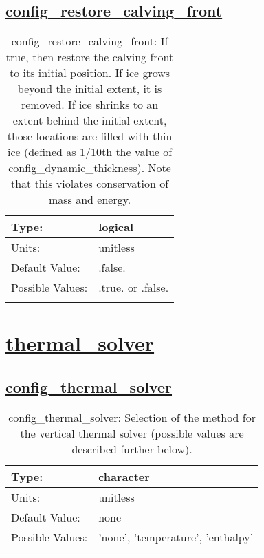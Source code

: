 \subsection[config\_restore\_calving\_front]{\hyperref[sec:nm_tab_calving]{config\_restore\_calving\_front}}
\label{subsec:nm_sec_config_restore_calving_front}
\begin{center}
\begin{longtable}{| p{2.0in} || p{4.0in} |}
    \hline
    Type: & logical \\
    \hline
    Units: & \si{unitless} \\
    \hline
    Default Value: & .false. \\
    \hline
    Possible Values: & .true. or .false. \\
    \hline
    \caption{config\_restore\_calving\_front: If true, then restore the calving front to its initial position.  If ice grows beyond the initial extent, it is removed.  If ice shrinks to an extent behind the initial extent, those locations are filled with thin ice (defined as 1/10th the value of config\_dynamic\_thickness).  Note that this violates conservation of mass and energy.}
\end{longtable}
\end{center}
\section[thermal\_solver]{\hyperref[sec:nm_tab_thermal_solver]{thermal\_solver}}
\label{sec:nm_sec_thermal_solver}
\subsection[config\_thermal\_solver]{\hyperref[sec:nm_tab_thermal_solver]{config\_thermal\_solver}}
\label{subsec:nm_sec_config_thermal_solver}
\begin{center}
\begin{longtable}{| p{2.0in} || p{4.0in} |}
    \hline
    Type: & character \\
    \hline
    Units: & \si{unitless} \\
    \hline
    Default Value: & none \\
    \hline
    Possible Values: & 'none', 'temperature', 'enthalpy' \\
    \hline
    \caption{config\_thermal\_solver: Selection of the method for the vertical thermal solver (possible values are described further below).}
\end{longtable}
\end{center}
